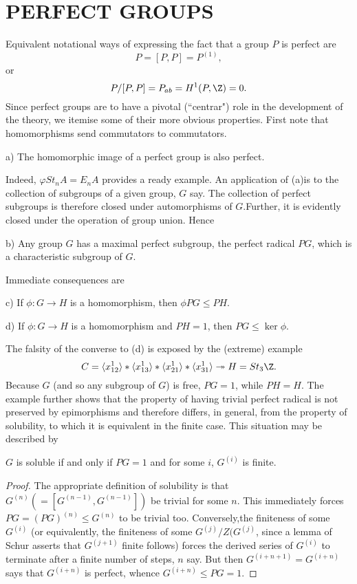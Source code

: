 \section*{PERFECT GROUPS}
Equivalent notational ways of expressing the fact that a group $P$ is perfect are
\[P=[P,P]=P^{(1)},\]
or
\[P/[P,P]=P_{ab}=H^1(P,\Z)=0.\]
Since perfect groups are to have a pivotal (``centrar") role in the development of the theory, we itemise some of their more obvious properties. First note that homomorphisms send commutators to commutators.
\begin{prop}
a) The homomorphic image of a perfect group is also perfect.
\end{prop}
Indeed, $\varphi St_nA=E_nA$ provides a ready example. An application of (a)is to the collection of subgroups of a given group, $G$ say. The collection of perfect subgroups is therefore closed under automorphisms of $G$.Further, it is evidently closed under the operation of group union. Hence
\begin{prop}
b) Any group $G$ has a maximal perfect subgroup, the perfect radical $PG$, which is a characteristic subgroup of $G$.
\end{prop}
Immediate consequences are
\begin{prop}
c) If $\phi:G \rightarrow H$ is a homomorphism, then $\phi PG \leqslant PH$.
\end{prop}
\begin{prop}
d) If $\phi:G \rightarrow H$ is a homomorphism and $ PH= 1$, then  $PG \leqslant \ker \phi$.
\end{prop}
The falsity of the converse to (d) is exposed by the (extreme) example
\[C=\langle x_{12}^1\rangle *\langle x_{13}^1\rangle *\langle x_{21}^1\rangle *\langle x_{31}^1\rangle \twoheadrightarrow H=St_3\Z.\]
Because $G$ (and so any subgroup of $G$) is free, $PG=1$, while $PH=H$. The example further shows that the property of having trivial perfect radical is not preserved by epimorphisms and therefore differs, in general, from the property of solubility, to which it is equivalent in the finite case. This situation may be described by
\begin{prop}
$G$ is soluble if and only if $PG=1$ and for some $i$, $G^{(i)}$ is finite.
\end{prop}
\begin{proof}
The appropriate definition of solubility is that $G^{(n)}(=[G^{(n-1)},G^{(n-1)}])$ be trivial for some $n$. This immediately forces $PG=(PG)^{(n)}\leqslant G^{(n)}$ to be trivial too. Conversely,the finiteness of some $G^{(i)}$ (or equivalently, the finiteness of some $G^{(j)}/Z(G^{(j)}$, since a lemma of Schur asserts that $G^{(j+1)}$ finite follows) forces the derived series of $G^{(i)}$ to terminate after a finite number of steps, $n$ say. But then $G^{(i+n+1)}=G^{(i+n)}$ says that $G^{(i+n)}$ is perfect, whence
$G^{(i+n)}\leqslant PG=1$.
\end{proof}

